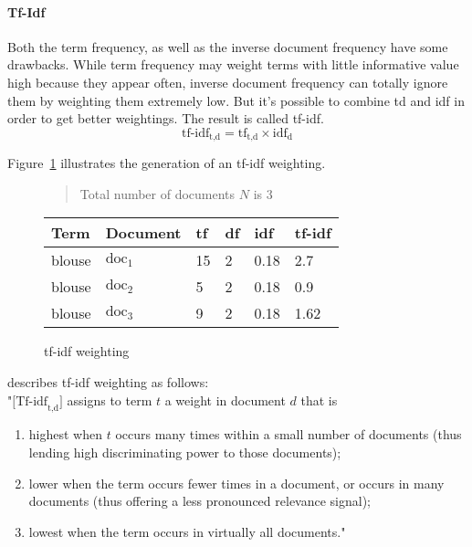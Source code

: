 \paragraph{Tf-Idf}
\label{sec:tfidf}
Both the term frequency, as well as the inverse document frequency have some drawbacks.
While term frequency may weight terms with little informative value high because they appear often, inverse document frequency can totally ignore them by weighting them extremely low.
But it's possible to combine td and idf in order to get better weightings.
The result is called tf-idf.\citep[p.~118-119]{manning:2009}
\begin{equation}
    \text{tf-idf}_{\text{t,d}} = \text{tf}_\text{t,d} \times \text{idf}_\text{d}
    \label{eq:tf-idf-forumula}
\end{equation}

\noindent
Figure~\ref{fig:tfidfweighting} illustrates the generation of an tf-idf weighting.
\begin{figure}[h]

    \begin{quote}
        Total number of documents $N$ is 3\\
    \end{quote}

    \center
    \begin{tabular}{ l l | l l l l }
        \rowcolor{\dustRowHead}
        Term                    & Document          & tf    & df & idf   & tf-idf\\\hline
        blouse                  & $\text{doc}_1$    & 15    &  2 & 0.18  & 2.7\\
        blouse                  & $\text{doc}_2$    & 5     &  2 & 0.18  & 0.9\\
        blouse                  & $\text{doc}_3$    & 9     &  2 & 0.18  & 1.62\\
    \end{tabular}
    \caption{tf-idf weighting}
    \label{fig:tfidfweighting}
\end{figure}

\noindent
\citeauthor{manning:2009} describes tf-idf weighting as follows:\\
"$\text{[Tf-idf}_{\text{t,d}}\text{]}$ assigns to term $t$ a weight in document $d$ that is
\begin{enumerate}
    \item highest when $t$ occurs many times within a small number of documents
    (thus lending high discriminating power to those documents);
    \item lower when the term occurs fewer times in a document, or occurs in many
    documents (thus offering a less pronounced relevance signal);
    \item lowest when the term occurs in virtually all documents."
\end{enumerate}
\citep[p.~119]{manning:2009}

